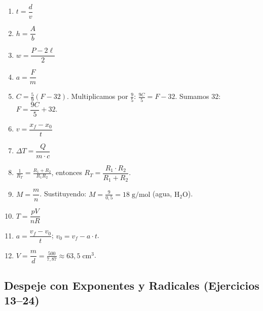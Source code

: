\documentclass[12pt, letterpaper]{article}
\begin{document}
  \begin{enumerate}[leftmargin=*, label=\textbf{\arabic*.}]
    \item $t = \dfrac{d}{v}$

    \item $h = \dfrac{A}{b}$

    \item $w = \dfrac{P - 2\ell}{2}$

    \item $a = \dfrac{F}{m}$

    \item $C = \frac{5}{9}(F-32)$. Multiplicamos por $\frac{9}{5}$: $\frac{9C}{5} = F - 32$. Sumamos 32: $F = \dfrac{9C}{5} + 32$.

    \item $v = \dfrac{x_f - x_0}{t}$

    \item $\Delta T = \dfrac{Q}{m \cdot c}$

    \item $\frac{1}{R_T} = \frac{R_1 + R_2}{R_1 R_2}$, entonces $R_T = \dfrac{R_1 \cdot R_2}{R_1 + R_2}$.

    \item $M = \dfrac{m}{n}$. Sustituyendo: $M = \frac{9}{0{,}5} = 18\;\text{g/mol}$ (agua, $\text{H}_2\text{O}$).

    \item $T = \dfrac{pV}{nR}$

    \item $a = \dfrac{v_f - v_0}{t}$; \quad $v_0 = v_f - a \cdot t$.

    \item $V = \dfrac{m}{d} = \frac{500}{7{,}87} \approx 63{,}5\;\text{cm}^3$.
  \end{enumerate}

  \subsection*{Despeje con Exponentes y Radicales (Ejercicios 13--24)}
\end{document}
